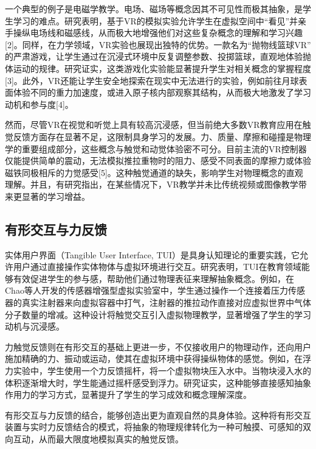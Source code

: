 一个典型的例子是电磁学教学。电场、磁场等概念因其不可见性而极其抽象，是学生学习的难点。研究表明，基于VR的模拟实验允许学生在虚拟空间中“看见”并亲手操纵电场线和磁感线，从而极大地增强他们对这些复杂概念的理解和学习兴趣[2]。同样，在力学领域，VR实验也展现出独特的优势。一款名为“抛物线篮球VR”
的严肃游戏，让学生通过在沉浸式环境中反复调整参数、投掷篮球，直观地体验抛体运动的规律。研究证实，这类游戏化实验能显著提升学生对相关概念的掌握程度[3]。此外，VR还能让学生安全地探索在现实中无法进行的实验，例如前往月球表面体验不同的重力加速度，或进入原子核内部观察其结构，从而极大地激发了学习动机和参与度[4]。

然而，尽管VR在视觉和听觉上具有较高沉浸感，但当前绝大多数VR教育应用在触觉反馈方面存在显著不足，这限制具身学习的发展。力、质量、摩擦和碰撞是物理学的重要组成部分，这些概念与触觉和动觉体验密不可分。目前主流的VR控制器仅能提供简单的震动，无法模拟推拉重物时的阻力、感受不同表面的摩擦力或体验磁铁同极相斥的力觉感受[5]。这种触觉通道的缺失，影响学生对物理概念的直观理解。并且，有研究指出，在某些情况下，VR教学并未比传统视频或图像教学带来更显著的学习增益。

\subsection{有形交互与力反馈}
实体用户界面（Tangible User Interface, TUI）是具身认知理论的重要实践，它允许用户通过直接操作实体物体与虚拟环境进行交互。研究表明，TUI在教育领域能够有效促进学生的参与感，帮助他们通过物理表征来理解抽象概念。例如，在Chao等人开发的传感器增强型虚拟实验室中，学生通过操作一个连接着压力传感器的真实注射器来向虚拟容器中打气，注射器的推拉动作直接对应虚拟世界中气体分子数量的增减。这种设计将触觉交互引入虚拟物理教学，显著增强了学生的学习动机与沉浸感。

力触觉反馈则在有形交互的基础上更进一步，不仅接收用户的物理动作，还向用户施加精确的力、振动或运动，使其在虚拟环境中获得操纵物体的感觉。例如，在浮力实验中，学生使用一个力反馈摇杆，将一个虚拟物块压入水中。当物块浸入水的体积逐渐增大时，学生能通过摇杆感受到浮力。研究证实，这种能够直接感知抽象作用力的学习方式，显著提升了学生的学习成效和概念理解深度。

有形交互与力反馈的结合，能够创造出更为直观自然的具身体验。这种将有形交互装置与实时力反馈结合的模式，将抽象的物理规律转化为一种可触摸、可感知的双向互动，从而最大限度地模拟真实的触觉反馈。



